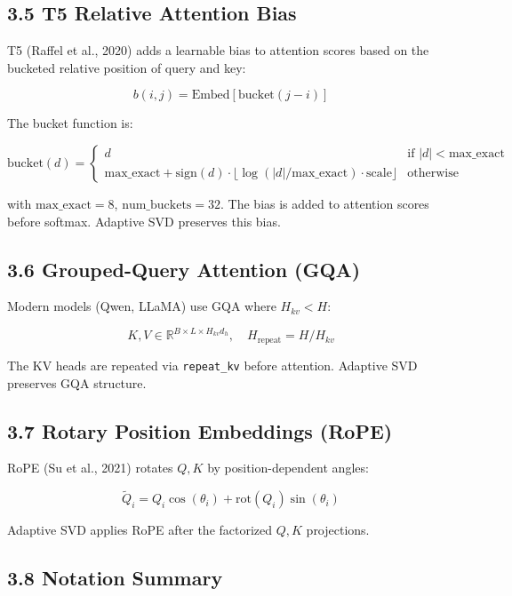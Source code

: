 \subsection{3.5 T5 Relative Attention Bias}

T5 (Raffel et al., 2020) adds a learnable bias to attention scores based on 
the bucketed relative position of query and key:

\[
b(i, j) = \text{Embed}[\text{bucket}(j - i)]
\tag{3.9}
\]

The bucket function is:

\[
\text{bucket}(d) = \begin{cases}
d & \text{if } |d| < \text{max\_exact} \\
\text{max\_exact} + \text{sign}(d) \cdot \lfloor \log(|d| / \text{max\_exact}) \cdot \text{scale} \rfloor & \text{otherwise}
\end{cases}
\tag{3.10}
\]

with $\text{max\_exact} = 8$, $\text{num\_buckets} = 32$. The bias is added 
to attention scores before softmax. Adaptive SVD preserves this bias.

\subsection{3.6 Grouped-Query Attention (GQA)}

Modern models (Qwen, LLaMA) use GQA where $H_{kv} < H$:

\[
K, V \in \mathbb{R}^{B \times L \times H_{kv} d_h}, \quad H_\text{repeat} = H / H_{kv}
\tag{3.11}
\]

The KV heads are repeated via \texttt{repeat\_kv} before attention. Adaptive SVD 
preserves GQA structure.

\subsection{3.7 Rotary Position Embeddings (RoPE)}

RoPE (Su et al., 2021) rotates $Q, K$ by position-dependent angles:

\[
\tilde{Q}_i = Q_i \cos(\theta_i) + \mathrm{rot}(Q_i) \sin(\theta_i)
\tag{3.12}
\]

Adaptive SVD applies RoPE after the factorized $Q, K$ projections.

\subsection{3.8 Notation Summary}
